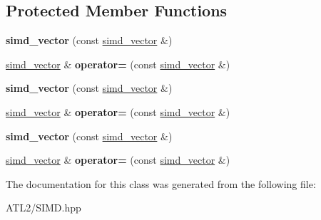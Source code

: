 \subsection*{Protected Member Functions}
\begin{DoxyCompactItemize}
\item 
\hypertarget{classsimd_1_1simd__vector_a38b79750c5b3a2af5dde1bf2491dadd2}{{\bfseries simd\+\_\+vector} (const \hyperlink{classsimd_1_1simd__vector}{simd\+\_\+vector} \&)}\label{classsimd_1_1simd__vector_a38b79750c5b3a2af5dde1bf2491dadd2}

\item 
\hypertarget{classsimd_1_1simd__vector_a50c550db18d1c95b93969ee459df96cc}{\hyperlink{classsimd_1_1simd__vector}{simd\+\_\+vector} \& {\bfseries operator=} (const \hyperlink{classsimd_1_1simd__vector}{simd\+\_\+vector} \&)}\label{classsimd_1_1simd__vector_a50c550db18d1c95b93969ee459df96cc}

\item 
\hypertarget{classsimd_1_1simd__vector_a38b79750c5b3a2af5dde1bf2491dadd2}{{\bfseries simd\+\_\+vector} (const \hyperlink{classsimd_1_1simd__vector}{simd\+\_\+vector} \&)}\label{classsimd_1_1simd__vector_a38b79750c5b3a2af5dde1bf2491dadd2}

\item 
\hypertarget{classsimd_1_1simd__vector_a50c550db18d1c95b93969ee459df96cc}{\hyperlink{classsimd_1_1simd__vector}{simd\+\_\+vector} \& {\bfseries operator=} (const \hyperlink{classsimd_1_1simd__vector}{simd\+\_\+vector} \&)}\label{classsimd_1_1simd__vector_a50c550db18d1c95b93969ee459df96cc}

\item 
\hypertarget{classsimd_1_1simd__vector_a38b79750c5b3a2af5dde1bf2491dadd2}{{\bfseries simd\+\_\+vector} (const \hyperlink{classsimd_1_1simd__vector}{simd\+\_\+vector} \&)}\label{classsimd_1_1simd__vector_a38b79750c5b3a2af5dde1bf2491dadd2}

\item 
\hypertarget{classsimd_1_1simd__vector_a50c550db18d1c95b93969ee459df96cc}{\hyperlink{classsimd_1_1simd__vector}{simd\+\_\+vector} \& {\bfseries operator=} (const \hyperlink{classsimd_1_1simd__vector}{simd\+\_\+vector} \&)}\label{classsimd_1_1simd__vector_a50c550db18d1c95b93969ee459df96cc}

\end{DoxyCompactItemize}


The documentation for this class was generated from the following file\+:\begin{DoxyCompactItemize}
\item 
A\+T\+L2/S\+I\+M\+D.\+hpp\end{DoxyCompactItemize}

